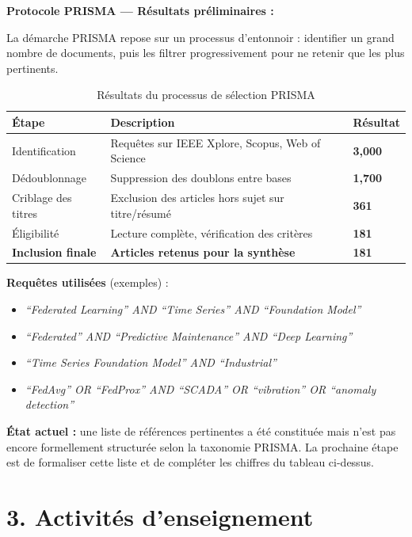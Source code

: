 \documentclass[12pt, a4paper]{report}
\begin{document}
\textbf{Protocole PRISMA — Résultats préliminaires :}

La démarche PRISMA repose sur un processus d'entonnoir : identifier un grand nombre
de documents, puis les filtrer progressivement pour ne retenir que les plus pertinents.

\begin{table}[h!]
\centering
\caption{Résultats du processus de sélection PRISMA}
\label{tab:prisma-results}
\renewcommand{\arraystretch}{1.5}
\begin{tabularx}{\textwidth}{lXC}
\toprule
Étape & Description & Résultat \\
\midrule
Identification & Requêtes sur IEEE Xplore, Scopus, Web of Science &
\textbf{3,000} \\
Dédoublonnage & Suppression des doublons entre bases &
\textbf{1,700} \\
Criblage des titres & Exclusion des articles hors sujet sur titre/résumé &
\textbf{361} \\
Éligibilité & Lecture complète, vérification des critères &
\textbf{181} \\
\textbf{Inclusion finale} & \textbf{Articles retenus pour la synthèse} &
\textbf{181} \\
\bottomrule
\end{tabularx}
\end{table}

\textbf{Requêtes utilisées} (exemples) :
\begin{itemize}[noitemsep]
  \item \textit{``Federated Learning'' AND ``Time Series'' AND ``Foundation Model''}
  \item \textit{``Federated'' AND ``Predictive Maintenance'' AND ``Deep Learning''}
  \item \textit{``Time Series Foundation Model'' AND ``Industrial''}
  \item \textit{``FedAvg'' OR ``FedProx'' AND ``SCADA'' OR ``vibration'' OR ``anomaly detection''}
\end{itemize}

\textbf{État actuel :} une liste de références pertinentes a été constituée mais n'est
pas encore formellement structurée selon la taxonomie PRISMA. La prochaine étape est
de formaliser cette liste et de compléter les chiffres du tableau ci-dessus.

\section*{3. Activités d'enseignement}
\end{document}
